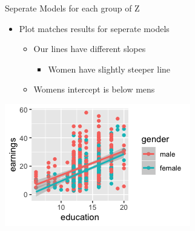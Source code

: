 \documentclass[8pt,ignorenonframetext,dvipsnames]{beamer}
\providecommand{\tightlist}{%
  \setlength{\itemsep}{0pt}\setlength{\parskip}{0pt}}
\let\olditem\item
\renewcommand{\item}{%
  \olditem\vspace{4pt}
}
\begin{document}
\begin{frame}{Seperate Models for each group of Z}
\protect\hypertarget{seperate-models-for-each-group-of-z-1}{}

\begin{itemize}
\tightlist
\item
  Plot matches results for seperate models

  \begin{itemize}
  \tightlist
  \item
    Our lines have different slopes

    \begin{itemize}
    \tightlist
    \item
      Women have slightly steeper line
    \end{itemize}
  \item
    Womens intercept is below mens
  \end{itemize}
\end{itemize}

\includegraphics{Rplot01.png}

\end{frame}
\end{document}
